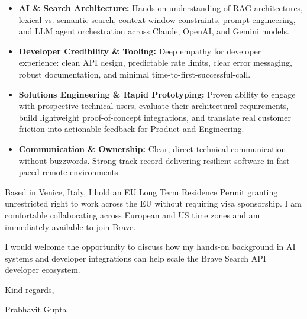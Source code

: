 \documentclass[11pt,a4paper]{article}
\begin{document}
\begin{itemize}[leftmargin=*]
    \item \textbf{AI \& Search Architecture:} Hands-on understanding of RAG architectures, lexical vs. semantic search, context window constraints, prompt engineering, and LLM agent orchestration across Claude, OpenAI, and Gemini models.
    \item \textbf{Developer Credibility \& Tooling:} Deep empathy for developer experience: clean API design, predictable rate limits, clear error messaging, robust documentation, and minimal time-to-first-successful-call.
    \item \textbf{Solutions Engineering \& Rapid Prototyping:} Proven ability to engage with prospective technical users, evaluate their architectural requirements, build lightweight proof-of-concept integrations, and translate real customer friction into actionable feedback for Product and Engineering.
    \item \textbf{Communication \& Ownership:} Clear, direct technical communication without buzzwords. Strong track record delivering resilient software in fast-paced remote environments.
\end{itemize}

\noindent Based in Venice, Italy, I hold an EU Long Term Residence Permit granting unrestricted right to work across the EU without requiring visa sponsorship. I am comfortable collaborating across European and US time zones and am immediately available to join Brave.

\noindent I would welcome the opportunity to discuss how my hands-on background in AI systems and developer integrations can help scale the Brave Search API developer ecosystem.

\vspace{8pt}

\noindent Kind regards,

\vspace{8pt}

\noindent Prabhavit Gupta
\end{document}
